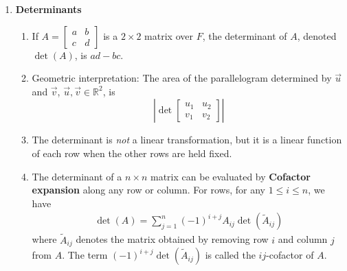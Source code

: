 \documentclass[10pt]{article}
\begin{document}
\begin{multicols*}{2}
\begin{enumerate}
    \item \textbf{Determinants}
    \begin{enumerate}
        \item If $A = \begin{bmatrix} a & b \\ c & d \end{bmatrix}$ is a $2 \times 2$ matrix over $F$, the determinant of $A$, denoted $\det(A)$, is $ad-bc$.
        \item Geometric interpretation: The area of the parallelogram determined by $\vec{u}$ and $\vec{v}$, $\vec{u}, \vec{v} \in \mathbb{R}^2$, is $$\left| \det \begin{bmatrix} u_1 & u_2 \\ v_1 & v_2 \end{bmatrix} \right| $$
        \item The determinant is \textit{not} a linear transformation, but it is a linear function of each row when the other rows are held fixed.
        \item The determinant of a $n \times n$ matrix can be evaluated by \textbf{Cofactor expansion} along any row or column. For rows, for any $1 \leq i \leq n$, we have
        \begin{align*}
            \det(A) = \sum_{j=1}^{n} (-1)^{i+j} A_{ij} \det(\tilde{A}_{ij})
        \end{align*}
        where $\tilde{A}_{ij}$ denotes the matrix obtained by removing row $i$ and column $j$ from $A$. The term $(-1)^{i+j} \det(\tilde{A}_{ij})$ is called the $ij$-cofactor of $A$.

\end{enumerate}
\end{enumerate}
\end{multicols*}
\end{document}
